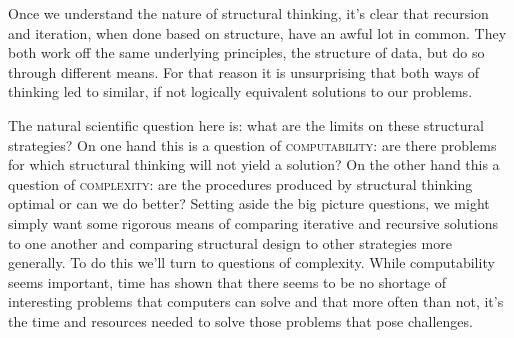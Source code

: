 \documentclass[]{tufte-handout}
\begin{document}
Once we understand the nature of structural thinking, it's clear that recursion and iteration, when done based on structure, have an awful lot in common. They both work off the same underlying principles, the structure of data, but do so through different means. For that reason it is unsurprising that both ways of thinking led to similar, if not logically equivalent solutions to our problems.

The natural scientific question here is: what are the limits on these structural strategies?  On one hand this is a question of \textsc{computability}: are there problems for which structural thinking will not yield a solution?  On the other hand this a question of \textsc{complexity}: are the procedures produced by structural thinking optimal or can we do better? Setting aside the big picture questions, we might simply want some rigorous means of comparing iterative and recursive solutions to one another and comparing structural design to other strategies more generally. To do this we'll turn to questions of complexity. While computability seems important, time has shown that there seems to be no shortage of interesting problems that computers can solve and that more often than not, it's the time and resources needed to solve those problems that pose challenges.
\end{document}
